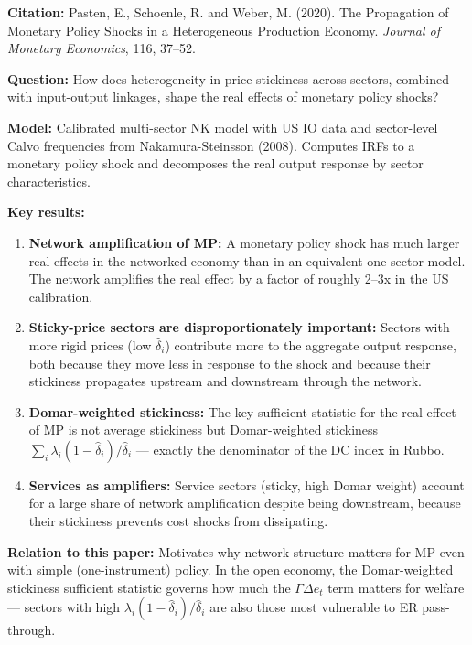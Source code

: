 \documentclass[12pt]{article}
\begin{document}
\textbf{Citation:} Pasten, E., Schoenle, R. and Weber, M. (2020). The Propagation of Monetary Policy Shocks in a Heterogeneous Production Economy. \textit{Journal of Monetary Economics}, 116, 37--52.

\textbf{Question:} How does heterogeneity in price stickiness across sectors, combined with input-output linkages, shape the real effects of monetary policy shocks?

\textbf{Model:} Calibrated multi-sector NK model with US IO data and sector-level Calvo frequencies from Nakamura-Steinsson (2008). Computes IRFs to a monetary policy shock and decomposes the real output response by sector characteristics.

\textbf{Key results:}
\begin{enumerate}
    \item \textbf{Network amplification of MP:} A monetary policy shock has much larger real effects in the networked economy than in an equivalent one-sector model. The network amplifies the real effect by a factor of roughly 2--3x in the US calibration.
    \item \textbf{Sticky-price sectors are disproportionately important:} Sectors with more rigid prices (low $\hat{\delta}_i$) contribute more to the aggregate output response, both because they move less in response to the shock and because their stickiness propagates upstream and downstream through the network.
    \item \textbf{Domar-weighted stickiness:} The key sufficient statistic for the real effect of MP is not average stickiness but Domar-weighted stickiness $\sum_i \lambda_i(1-\hat{\delta}_i)/\hat{\delta}_i$ --- exactly the denominator of the DC index in Rubbo.
    \item \textbf{Services as amplifiers:} Service sectors (sticky, high Domar weight) account for a large share of network amplification despite being downstream, because their stickiness prevents cost shocks from dissipating.
\end{enumerate}

\textbf{Relation to this paper:} Motivates why network structure matters for MP even with simple (one-instrument) policy. In the open economy, the Domar-weighted stickiness sufficient statistic governs how much the $\Gamma\Delta e_t$ term matters for welfare --- sectors with high $\lambda_i(1-\hat{\delta}_i)/\hat{\delta}_i$ are also those most vulnerable to ER pass-through.

\end{document}
